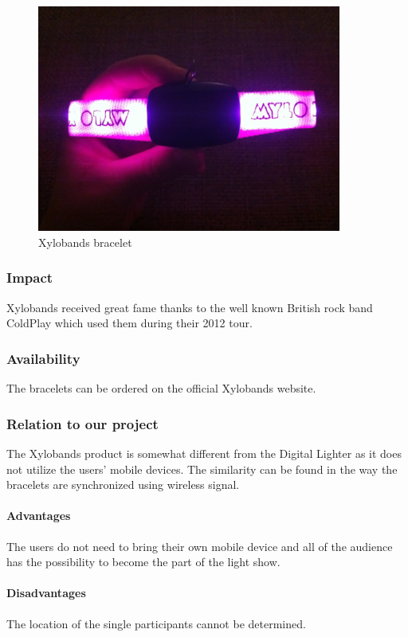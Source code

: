 \begin{figure}[!h]
	\centering
		\includegraphics[width=10cm]{preliminaryStudies/xylo.jpg}
	\caption{Xylobands bracelet}
	\label{fig:xylo}
\end{figure}

\subsubsection{Impact}
Xylobands received great fame thanks to the well known British rock band ColdPlay which used them during their 2012 tour.

\subsubsection{Availability}
The bracelets can be ordered on the official Xylobands website.

\subsubsection{Relation to our project}
The Xylobands product is somewhat different from the Digital Lighter as it does not utilize the users' mobile devices. 
The similarity can be found in the way the bracelets are synchronized using wireless signal. 

\paragraph{Advantages}
The users do not need to bring their own mobile device and all of the audience has the possibility to become the part of the light show.

\paragraph{Disadvantages}
The location of the single participants cannot be determined.

